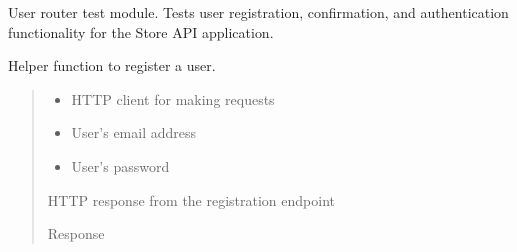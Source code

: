 \documentclass[letterpaper,10pt,openany,oneside,english]{sphinxmanual}
\begin{document}
\label{\detokenize{modules/tests:module-storeapi.tests.routers.test_user}}
\sphinxAtStartPar
User router test module.
Tests user registration, confirmation, and authentication functionality
for the Store API application.

\begin{savenotes}\begin{fulllineitems}
\label{\detokenize{modules/tests:storeapi.tests.routers.test_user.register_user}}
\pysigstartsignatures
{}
\pysigstopsignatures
\sphinxAtStartPar
Helper function to register a user.
\begin{quote}\begin{description}
\begin{itemize}
\item {} 
\sphinxAtStartPar
{} \textendash{} HTTP client for making requests

\item {} 
\sphinxAtStartPar
{} \textendash{} User’s email address

\item {} 
\sphinxAtStartPar
{} \textendash{} User’s password

\end{itemize}

\sphinxAtStartPar
HTTP response from the registration endpoint

\sphinxAtStartPar
Response

\end{description}\end{quote}

\end{fulllineitems}\end{savenotes}
\end{document}
